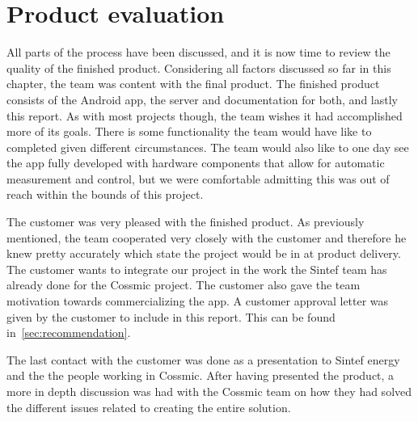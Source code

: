 \section{Product evaluation}
All parts of the process have been discussed, and it is now time to review the quality of the finished product. Considering all factors discussed so far in this chapter, the team was content with the final product. The finished product consists of the Android app, the server and documentation for both, and lastly this report. As with most projects though, the team wishes it had accomplished more of its goals. There is some functionality the team would have like to completed given different circumstances. The team would also like to one day see the app fully developed with hardware components that allow for automatic measurement and control, but we were comfortable admitting this was out of reach within the bounds of this project. 

The customer was very pleased with the finished product. As previously mentioned, the team cooperated very closely with the customer and therefore he knew pretty accurately which state the project would be in at product delivery. The customer wants to integrate our project in the work the Sintef team has already done for the Cossmic project. The customer also gave the team motivation towards commercializing the app. A customer approval letter was given by the customer to include in this report. This can be found in~\ref{sec:recommendation}.

The last contact with the customer was done as a presentation to Sintef energy and the the people working in Cossmic. After having presented the product, a more in depth discussion was had with the Cossmic team on how they had solved the different issues related to creating the entire solution. 
